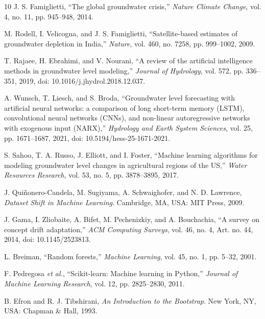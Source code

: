 \documentclass[conference]{IEEEtran}
\begin{document}
\begin{thebibliography}{10}
J. S. Famiglietti, ``The global groundwater crisis,'' \emph{Nature Climate Change}, vol. 4, no. 11, pp. 945--948, 2014.

M. Rodell, I. Velicogna, and J. S. Famiglietti, ``Satellite-based estimates of groundwater depletion in India,'' \emph{Nature}, vol. 460, no. 7258, pp. 999--1002, 2009.

T. Rajaee, H. Ebrahimi, and V. Nourani, ``A review of the artificial intelligence methods in groundwater level modeling,'' \emph{Journal of Hydrology}, vol. 572, pp. 336--351, 2019, doi: 10.1016/j.jhydrol.2018.12.037.

A. Wunsch, T. Liesch, and S. Broda, ``Groundwater level forecasting with artificial neural networks: a comparison of long short-term memory (LSTM), convolutional neural networks (CNNs), and non-linear autoregressive networks with exogenous input (NARX),'' \emph{Hydrology and Earth System Sciences}, vol. 25, pp. 1671--1687, 2021, doi: 10.5194/hess-25-1671-2021.

S. Sahoo, T. A. Russo, J. Elliott, and I. Foster, ``Machine learning algorithms for modeling groundwater level changes in agricultural regions of the US,'' \emph{Water Resources Research}, vol. 53, no. 5, pp. 3878--3895, 2017.

J. Qui\~nonero-Candela, M. Sugiyama, A. Schwaighofer, and N. D. Lawrence, \emph{Dataset Shift in Machine Learning}. Cambridge, MA, USA: MIT Press, 2009.

J. Gama, I. Zliobaite, A. Bifet, M. Pechenizkiy, and A. Bouchachia, ``A survey on concept drift adaptation,'' \emph{ACM Computing Surveys}, vol. 46, no. 4, Art. no. 44, 2014, doi: 10.1145/2523813.

L. Breiman, ``Random forests,'' \emph{Machine Learning}, vol. 45, no. 1, pp. 5--32, 2001.

F. Pedregosa \emph{et al.}, ``Scikit-learn: Machine learning in Python,'' \emph{Journal of Machine Learning Research}, vol. 12, pp. 2825--2830, 2011.

B. Efron and R. J. Tibshirani, \emph{An Introduction to the Bootstrap}. New York, NY, USA: Chapman \& Hall, 1993.
\end{thebibliography}
\balance
\end{document}
